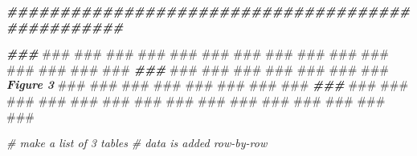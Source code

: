 \documentclass[
]{article}
\newenvironment{Shaded}{\begin{snugshade}}{\end{snugshade}}
\newcommand{\AlertTok}[1]{\textcolor[rgb]{0.94,0.16,0.16}{#1}}
\newcommand{\CommentTok}[1]{\textcolor[rgb]{0.56,0.35,0.01}{\textit{#1}}}
\newcommand{\DocumentationTok}[1]{\textcolor[rgb]{0.56,0.35,0.01}{\textbf{\textit{#1}}}}
\begin{document}
\begin{Shaded}
\begin{Highlighting}[]
\DocumentationTok{\#\#\#\#\#\#\#\#\#\#\#\#\#\#\#\#\#\#\#\#\#\#\#\#\#\#\#\#\#\#\#\#\#\#\#\#\#\#\#\#\#\#\#\#\#\#\#\#\#}

\DocumentationTok{\#\#\# }\AlertTok{\#\#\#}\DocumentationTok{ }\AlertTok{\#\#\#}\DocumentationTok{ }\AlertTok{\#\#\#}\DocumentationTok{ }\AlertTok{\#\#\#}\DocumentationTok{ }\AlertTok{\#\#\#}\DocumentationTok{ }\AlertTok{\#\#\#}\DocumentationTok{ }\AlertTok{\#\#\#}\DocumentationTok{ }\AlertTok{\#\#\#}\DocumentationTok{ }\AlertTok{\#\#\#}\DocumentationTok{ }\AlertTok{\#\#\#}\DocumentationTok{ }\AlertTok{\#\#\#}\DocumentationTok{ }\AlertTok{\#\#\#}\DocumentationTok{ }\AlertTok{\#\#\#}\DocumentationTok{ }\AlertTok{\#\#\#}\DocumentationTok{ }\AlertTok{\#\#\#}\DocumentationTok{ }
\DocumentationTok{\#\#\# }\AlertTok{\#\#\#}\DocumentationTok{ }\AlertTok{\#\#\#}\DocumentationTok{ }\AlertTok{\#\#\#}\DocumentationTok{ }\AlertTok{\#\#\#}\DocumentationTok{ }\AlertTok{\#\#\#}\DocumentationTok{ }\AlertTok{\#\#\#}\DocumentationTok{ }\AlertTok{\#\#\#}\DocumentationTok{ Figure 3 }\AlertTok{\#\#\#}\DocumentationTok{ }\AlertTok{\#\#\#}\DocumentationTok{ }\AlertTok{\#\#\#}\DocumentationTok{ }\AlertTok{\#\#\#}\DocumentationTok{ }\AlertTok{\#\#\#}\DocumentationTok{ }\AlertTok{\#\#\#}\DocumentationTok{ }\AlertTok{\#\#\#}\DocumentationTok{ }\AlertTok{\#\#\#}\DocumentationTok{ }
\DocumentationTok{\#\#\# }\AlertTok{\#\#\#}\DocumentationTok{ }\AlertTok{\#\#\#}\DocumentationTok{ }\AlertTok{\#\#\#}\DocumentationTok{ }\AlertTok{\#\#\#}\DocumentationTok{ }\AlertTok{\#\#\#}\DocumentationTok{ }\AlertTok{\#\#\#}\DocumentationTok{ }\AlertTok{\#\#\#}\DocumentationTok{ }\AlertTok{\#\#\#}\DocumentationTok{ }\AlertTok{\#\#\#}\DocumentationTok{ }\AlertTok{\#\#\#}\DocumentationTok{ }\AlertTok{\#\#\#}\DocumentationTok{ }\AlertTok{\#\#\#}\DocumentationTok{ }\AlertTok{\#\#\#}\DocumentationTok{ }\AlertTok{\#\#\#}\DocumentationTok{ }\AlertTok{\#\#\#}\DocumentationTok{ }

\CommentTok{\# make a list of 3 tables }
\CommentTok{\# data is added row{-}by{-}row}


\end{Highlighting}
\end{Shaded}
\end{document}
